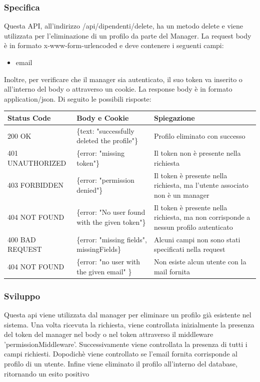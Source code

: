 \documentclass{report}
\begin{document}
		\subsubsection*{Specifica}
		Questa API, all'indirizzo /api/dipendenti/delete, ha un metodo delete e viene utilizzata per l'eliminazione di un profilo da parte del Manager.
		La request body è in formato x-www-form-urlencoded e deve contenere i seguenti campi:
		\begin{itemize}
			\item email
		\end{itemize}
		Inoltre, per verificare che il manager sia autenticato, il suo token va inserito o all'interno del body o attraverso un cookie.
		La response body è in formato application/json. Di seguito le possibili risposte:
		\begin{center} %
			\centering
			\begin{tabular}{ |p{4cm}|p{5cm}|p{4cm}| }
				\hline
				\centering Status Code & \qquad\quad Body e Cookie                                & \qquad\qquad Spiegazione                              \\ %
				\hline
				200 OK                 & \{text: "successfully deleted the profile"\} 			  & Profilo eliminato con successo                           \\
				\hline
				401 UNAUTHORIZED       & \{error: "missing token"\} 							  & Il token non è presente nella richiesta				  \\
				\hline
				403 FORBIDDEN		   & \{error: "permission denied"\}							  & Il token è presente nella richiesta, ma l'utente associato non è un manager \\	
				\hline
				404 NOT FOUND 		   & \{error: "No user found with the given token"\}          & Il token è presente nella richiesta, ma non corrisponde a nessun profilo autenticato \\
				\hline
				400 BAD REQUEST        & \{error: "missing fields", missingFields\}               & Alcuni campi non sono stati specificati nella request \\ %
				\hline
				404 NOT FOUND 		   & \{error: "no user with the given email" \}				  & Non esiste alcun utente con la mail fornita      \\
				\hline
			\end{tabular}
		\end{center}
		\subsubsection*{Sviluppo}
		Questa api viene utilizzata dal manager per eliminare un profilo già esistente nel sistema.
		Una volta ricevuta la richiesta, viene controllata inizialmente la presenza del token del manager nel body o nel token attraverso il middleware 'permissionMiddleware'.
		Successivamente viene controllata la presenza di tutti i campi richiesti.
		Dopodichè viene controllato se l'email fornita corrisponde al profilo di un utente.
		Infine viene eliminato il profilo all'interno del database, ritornando un esito positivo
\end{document}
